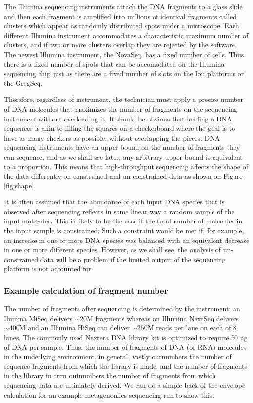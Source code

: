 \documentclass[onecolumn]{article}
\begin{document}
The Illumina sequencing instruments attach the DNA fragments to a glass slide and then each fragment is amplified into millions of identical fragments called clusters which appear as randomly distributed spots under a microscope. Each different Illumina instrument accommodates a characteristic maximum number of clusters, and if two or more clusters overlap they are rejected by the software. The newest Illumina instrument, the NovaSeq, has a fixed number of cells. Thus, there is a fixed number of spots that can be accomodated on the Illumina sequencing chip just as there are a fixed number of slots on the Ion platforms or the GregSeq.

Therefore, regardless of instrument, the technician must apply a precise number of DNA molecules that maximizes the number of fragments on the sequencing instrument without overloading it. It should be obvious that loading a DNA sequencer is akin to filling the squares on a checkerboard where the goal is to have as many checkers as possible, without overlapping the pieces. DNA sequencing instruments have an upper bound on the number of fragments they can sequence, and as we shall see later, any arbitrary upper bound is equivalent to a proportion. This means that high-throughput sequencing affects the shape of the data differently on constrained and un-constrained data as shown on Figure \ref{fig:shape}.

It is often assumed that the abundance of each input DNA species that is observed after sequencing reflects in some linear way a random sample of the input molecules. This is likely to be the case if the total number of molecules in the input sample is constrained. Such a constraint would be met if, for example, an increase in one or more DNA species was balanced with an equivalent decrease in one or more different species. However, as we shall see, the analysis of un-constrained data will be a problem if the limited output of the sequencing platform is not accounted for.

\hypertarget{example-calculation-of-fragment-number}{%
\subsubsection{Example calculation of fragment number}\label{example-calculation-of-fragment-number}}

The number of fragments after sequencing is determined by the instrument; an Ilumina MiSeq delivers \(\sim 20\)M fragments whereas an Illumina NextSeq delivers \(\sim 400\)M and an Illumina HiSeq can deliver \(\sim 250\)M reads per lane on each of 8 lanes. The commonly used Nextera DNA library kit is optimized to require 50 ng of DNA per sample. Thus, the number of fragments of DNA (or RNA) molecules in the underlying environment, in general, vastly outnumbers the number of sequence fragments from which the library is made, and the number of fragments in the library in turn outnumbers the number of fragments from which sequencing data are ultimately derived. We can do a simple back of the envelope calculation for an example metagenomics sequencing run to show this.
\end{document}
